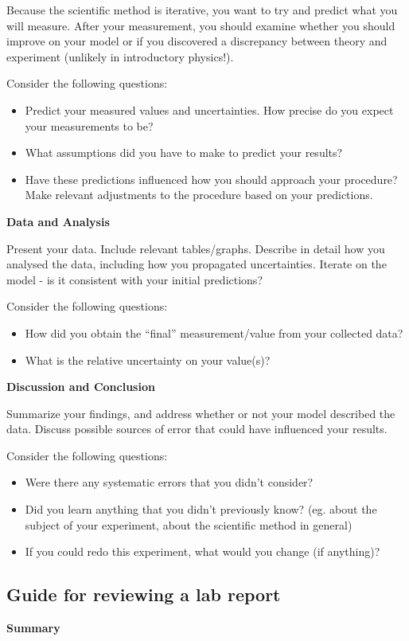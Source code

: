 Because the scientific method is iterative, you want to try and predict what you will measure. After your measurement, you should examine whether you should improve on your model or if you discovered a discrepancy between theory and experiment (unlikely in introductory physics!).

Consider the following questions:
\begin{itemize}
\item Predict your measured values and uncertainties. How precise do you expect your measurements to be?
\item What assumptions did you have to make to predict your results?
\item Have these predictions influenced how you should approach your procedure? Make relevant adjustments to the procedure based on your predictions.
\end{itemize}

\textbf{Data and Analysis}

Present your data. Include relevant tables/graphs. Describe in detail how you analysed the data, including how you propagated uncertainties. Iterate on the model - is it consistent with your initial predictions?

Consider the following questions:
\begin{itemize}
\item How did you obtain the ``final'' measurement/value from your collected data?
\item What is the relative uncertainty on your value(s)?
\end{itemize}

\textbf{Discussion and Conclusion}

Summarize your findings, and address whether or not your model described the data. Discuss possible sources of error that could have influenced your results.

Consider the following questions:
\begin{itemize}
\item Were there any systematic errors that you didn't consider?
\item Did you learn anything that you didn't previously know? (eg. about the subject of your experiment, about the scientific method in general)
\item If you could redo this experiment, what would you change (if anything)?
\end{itemize}

\newpage
\subsection{Guide for reviewing a lab report}
 \vspace{0.25cm}
\textbf{Summary}

